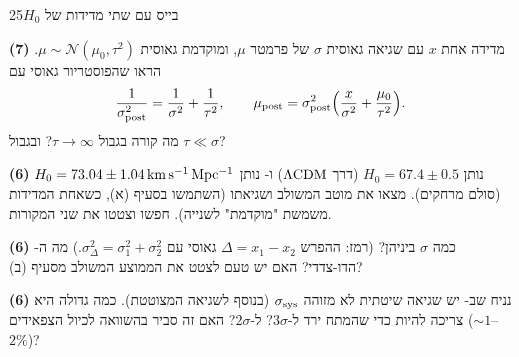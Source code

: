 \documentclass[11pt,a4paper]{article}
\begin{document}

\begin{question}{בייס עם שתי מדידות של $H_0$}{25}
\begin{parts}
\item \textbf{(7)} מדידה אחת $x$ עם שגיאה גאוסית $\sigma$ של פרמטר $\mu$, ומוקדמת גאוסית $\mu\sim\mathcal N(\mu_0,\tau^2)$. הראו שהפוסטריור גאוסי עם
\[\frac{1}{\sigma_{\rm post}^2}=\frac1{\sigma^2}+\frac1{\tau^2},\qquad \mu_{\rm post}=\sigma_{\rm post}^2\Big(\frac{x}{\sigma^2}+\frac{\mu_0}{\tau^2}\Big).\]
מה קורה בגבול $\tau\to\infty$? ובגבול $\tau\ll\sigma$?
\item \textbf{(6)}  נותן $H_0=67.4\pm0.5$ (דרך $\Lambda\mathrm{CDM}$) ו- נותן $H_0=73.04\pm1.04\,\mathrm{km\,s^{-1}\,Mpc^{-1}}$ (סולם מרחקים). מצאו את מוטב המשולב ושגיאתו (השתמשו בסעיף (א), כשאחת המדידות משמשת "מוקדמת" לשנייה). חפשו וצטטו את שני המקורות.
\item \textbf{(6)} כמה $\sigma$ ביניהן? (רמז: ההפרש $\Delta=x_1-x_2$ גאוסי עם $\sigma_\Delta^2=\sigma_1^2+\sigma_2^2$.) מה ה- הדו-צדדי? האם יש טעם לצטט את הממוצע המשולב מסעיף (ב)?
\item \textbf{(6)} נניח שב- יש שגיאה שיטתית לא מזוהה $\sigma_{\rm sys}$ (בנוסף לשגיאה המצוטטת). כמה גדולה היא צריכה להיות כדי שהמתח ירד ל-$3\sigma$? ל-$2\sigma$? האם זה סביר בהשוואה לכיול הצפאידים ($\sim1$--$2\%$)?
\end{parts}
\end{question}
\end{document}
